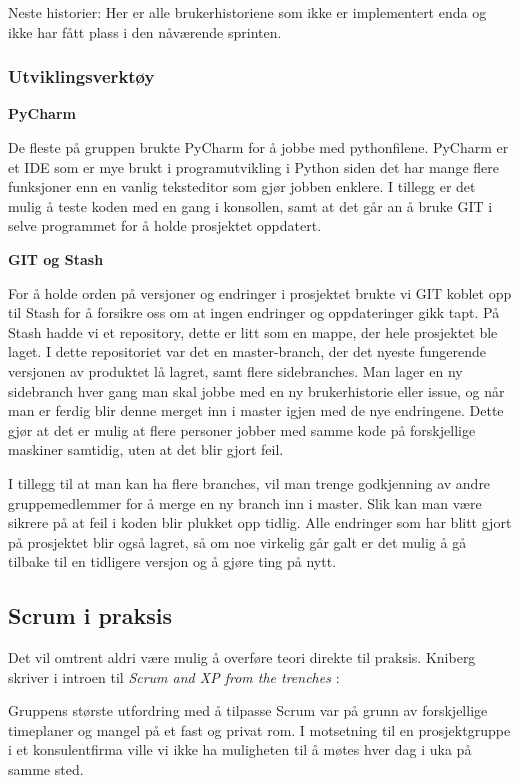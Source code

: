 \documentclass[12pt,a4paper,norsk]{article}
\begin{document}
    Neste historier:
    Her er alle brukerhistoriene som ikke er implementert enda og ikke har fått plass i den nåværende sprinten.
    
    \cite [side 72 -78]{kniberg}


	\subsubsection{Utviklingsverktøy}

\textbf{PyCharm}
\par De fleste på gruppen brukte PyCharm for å jobbe med pythonfilene. PyCharm er et IDE som er mye brukt i programutvikling i Python siden det  har mange flere funksjoner enn en vanlig teksteditor som gjør jobben enklere. I tillegg er det mulig å teste koden med en gang i konsollen, samt at det går an å bruke GIT i selve programmet for å holde prosjektet oppdatert.

\bigskip \noindent \textbf{GIT og Stash}
\par For å holde orden på versjoner og endringer i prosjektet brukte vi GIT koblet opp til Stash for å forsikre oss om at ingen endringer og oppdateringer gikk tapt. På Stash hadde vi et repository, dette er litt som en mappe, der hele prosjektet ble laget. I dette repositoriet var det en master-branch, der det nyeste fungerende versjonen av produktet lå lagret, samt flere sidebranches. Man lager en ny sidebranch hver gang man skal jobbe med en ny brukerhistorie eller issue, og når man er ferdig blir denne merget inn i master igjen med de nye endringene. Dette gjør at det er mulig at flere personer jobber med samme kode på forskjellige maskiner samtidig, uten at det blir gjort feil.

I tillegg til at man kan ha flere branches, vil man trenge godkjenning av andre gruppemedlemmer for å merge en ny branch inn i master. Slik kan man være sikrere på at feil i koden blir plukket opp tidlig. Alle endringer som har blitt gjort på prosjektet blir også lagret, så om noe virkelig går galt er det mulig å gå tilbake til en tidligere versjon og å gjøre ting på nytt.


	\subsection{Scrum i praksis}
    Det vil omtrent aldri være mulig å overføre teori direkte til praksis. Kniberg skriver i introen til \textit{Scrum and XP from the trenches} \cite[side 2]{kniberg}:
    
    \bigskip\begin{adjustwidth}{2.5em}{0pt}
    \end{adjustwidth}
    \bigskip Gruppens største utfordring med å tilpasse Scrum var på grunn av forskjellige timeplaner og mangel på et fast og privat rom. I motsetning til en prosjektgruppe i et konsulentfirma ville vi ikke ha muligheten til å møtes hver dag i uka på samme sted.
	
\end{document}
